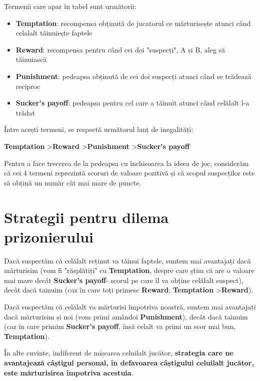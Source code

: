 Termenii care apar în tabel sunt următorii: 
 
\begin{itemize} 
	\item \textbf{Temptation}: recompensa obținută de jucatorul ce mărturisește atunci când celalalt tăinuiește faptele 
	\item \textbf{Reward}: recompensa pentru când cei doi "suspecți", A și B, aleg să tăinuiască 
	\item \textbf{Punishment}: pedeapsa obținută de cei doi suspecți atunci când se trădează reciproc 
	\item \textbf{Sucker's payoff}: pedeapsa pentru cel care a tăinuit atunci când celălalt l-a trădat 
\end{itemize} 
 
Între acești termeni, se respectă următorul lanț de inegalități: 
 
\begin{center} 
	\textbf{Temptation} \textgreater \textbf{Reward} \textgreater \textbf{Punishment} \textgreater \textbf{Sucker's payoff} 
\end{center} 

Pentru a face trecerea de la pedeapsa cu închisoarea la ideea de joc, considerăm că cei 4 termeni reprezintă scoruri de valoare pozitivă și că scopul suspecților este să obțină un număr cât mai mare de puncte. 

\section{Strategii pentru dilema prizonierului}

Dacă suspectăm că celălalt reținut va tăinui faptele, suntem mai avantajați dacă mărturisim (vom fi "răsplătiți" cu \textbf{Temptation}, despre care știm că are o valoare mai mare decât \textbf{Sucker's payoff}- scorul pe care îl va obține celălalt suspect), decât dacă tainuim (caz în care toți primesc \textbf{Reward}; \textbf{Temptation} \textgreater \textbf{Reward}).

Dacă suspectăm că celălalt va mărturisi împotriva noastră, suntem mai avantajați dacă mărturisim și noi (vom primi amândoi \textbf{Punishment}), decât dacă tainuim (caz în care primim \textbf{Sucker's payoff}, însă celalt va primi un scor mai bun, \textbf{Temptation}).

În alte cuvinte, indiferent de mișcarea celuilalt jucător, \textbf{strategia care ne avantajează câștigul personal, în defavoarea câștigului celuilalt jucător, este mărturisirea împotriva acestuia}.

